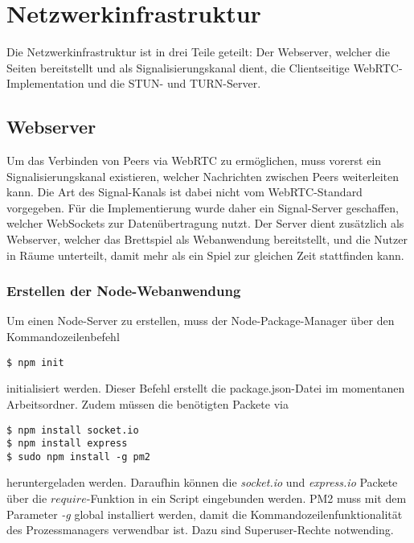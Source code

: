 \section{Netzwerkinfrastruktur}
Die Netzwerkinfrastruktur ist in drei Teile geteilt: Der Webserver, welcher die Seiten bereitstellt und als Signalisierungskanal dient, die Clientseitige WebRTC-Implementation und die \acs{STUN}- und \acs{TURN}-Server.

\subsection{Webserver}
Um das Verbinden von Peers via WebRTC zu ermöglichen, muss vorerst ein Signalisierungskanal existieren, welcher Nachrichten zwischen Peers weiterleiten kann. Die Art des Signal-Kanals ist dabei nicht vom WebRTC-Standard vorgegeben. Für die Implementierung wurde daher ein Signal-Server geschaffen, welcher WebSockets zur Datenübertragung nutzt. Der Server dient zusätzlich als Webserver, welcher das Brettspiel als Webanwendung bereitstellt, und die Nutzer in \glqq{}Räume\grqq{} unterteilt, damit mehr als ein Spiel zur gleichen Zeit stattfinden kann.\par

\subsubsection{Erstellen der Node-Webanwendung}
Um einen Node-Server zu erstellen, muss der Node-Package-Manager über den Kommandozeilenbefehl

\lstset{style=STYLE_COMMAND_LINE_ARGUMENT_SINGLE_LINE}
\begin{lstlisting}[belowskip=-0.8 \baselineskip]
$ npm init
\end{lstlisting}

initialisiert werden. Dieser Befehl erstellt die \glqq{}package.json\grqq{}-Datei im momentanen Arbeitsordner. Zudem müssen die benötigten Packete via

\lstset{style=STYLE_COMMAND_LINE_ARGUMENT_SINGLE_LINE}
\begin{lstlisting}[belowskip=-0.8 \baselineskip]
$ npm install socket.io
$ npm install express
$ sudo npm install -g pm2
\end{lstlisting}

heruntergeladen werden. Daraufhin können die \textit{socket.io} und \textit{express.io} Packete über die $require$-Funktion in ein Script eingebunden werden. PM2 muss mit dem Parameter \textit{-g} global installiert werden, damit die Kommandozeilenfunktionalität des Prozessmanagers verwendbar ist. Dazu sind Superuser-Rechte notwending.

